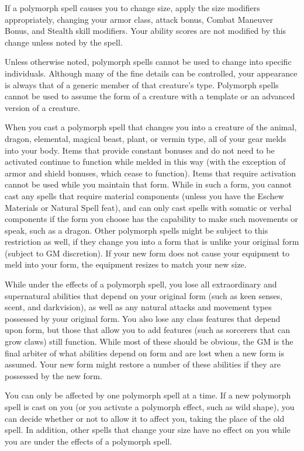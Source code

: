 If a polymorph spell causes you to change size, apply the size modifiers appropriately, changing your armor class, attack bonus, Combat Maneuver Bonus, and Stealth skill modifiers. Your ability scores are not modified by this change unless noted by the spell.
				
Unless otherwise noted, polymorph spells cannot be used to change into specific individuals. Although many of the fine details can be controlled, your appearance is always that of a generic member of that creature's type. Polymorph spells cannot be used to assume the form of a creature with a template or an advanced version of a creature.
				
When you cast a polymorph spell that changes you into a creature of the animal, dragon, elemental, magical beast, plant, or vermin type, all of your gear melds into your body. Items that provide constant bonuses and do not need to be activated continue to function while melded in this way (with the exception of armor and shield bonuses, which cease to function). Items that require activation cannot be used while you maintain that form. While in such a form, you cannot cast any spells that require material components (unless you have the Eschew Materials or Natural Spell feat), and can only cast spells with somatic or verbal components if the form you choose has the capability to make such movements or speak, such as a dragon. Other polymorph spells might be subject to this restriction as well, if they change you into a form that is unlike your original form (subject to GM discretion). If your new form does not cause your equipment to meld into your form, the equipment resizes to match your new size. 
				
While under the effects of a polymorph spell, you lose all extraordinary and supernatural abilities that depend on your original form (such as keen senses, scent, and darkvision), as well as any natural attacks and movement types possessed by your original form. You also lose any class features that depend upon form, but those that allow you to add features (such as sorcerers that can grow claws) still function. While most of these should be obvious, the GM is the final arbiter of what abilities depend on form and are lost when a new form is assumed. Your new form might restore a number of these abilities if they are possessed by the new form.
				
You can only be affected by one polymorph spell at a time. If a new polymorph spell is cast on you (or you activate a polymorph effect, such as wild shape), you can decide whether or not to allow it to affect you, taking the place of the old spell. In addition, other spells that change your size have no effect on you while you are under the effects of a polymorph spell.
				
